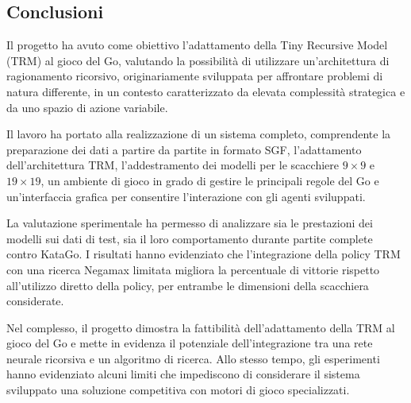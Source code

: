 \subsection{Conclusioni}

Il progetto ha avuto come obiettivo l'adattamento della Tiny Recursive Model (TRM) al gioco del Go, valutando la possibilità di utilizzare un'architettura di ragionamento ricorsivo, originariamente sviluppata per affrontare problemi di natura differente, in un contesto caratterizzato da elevata complessità strategica e da uno spazio di azione variabile.

Il lavoro ha portato alla realizzazione di un sistema completo, comprendente la preparazione dei dati a partire da partite in formato SGF, l'adattamento dell'architettura TRM, l'addestramento dei modelli per le scacchiere $9 \times 9$ e $19 \times 19$, un ambiente di gioco in grado di gestire le principali regole del Go e un'interfaccia grafica per consentire l'interazione con gli agenti sviluppati.

La valutazione sperimentale ha permesso di analizzare sia le prestazioni dei modelli sui dati di test, sia il loro comportamento durante partite complete contro KataGo. I risultati hanno evidenziato che l'integrazione della policy TRM con una ricerca Negamax limitata migliora la percentuale di vittorie rispetto all'utilizzo diretto della policy, per entrambe le dimensioni della scacchiera considerate.

Nel complesso, il progetto dimostra la fattibilità dell'adattamento della TRM al gioco del Go e mette in evidenza il potenziale dell'integrazione tra una rete neurale ricorsiva e un algoritmo di ricerca. Allo stesso tempo, gli esperimenti hanno evidenziato alcuni limiti che impediscono di considerare il sistema sviluppato una soluzione competitiva con motori di gioco specializzati.

